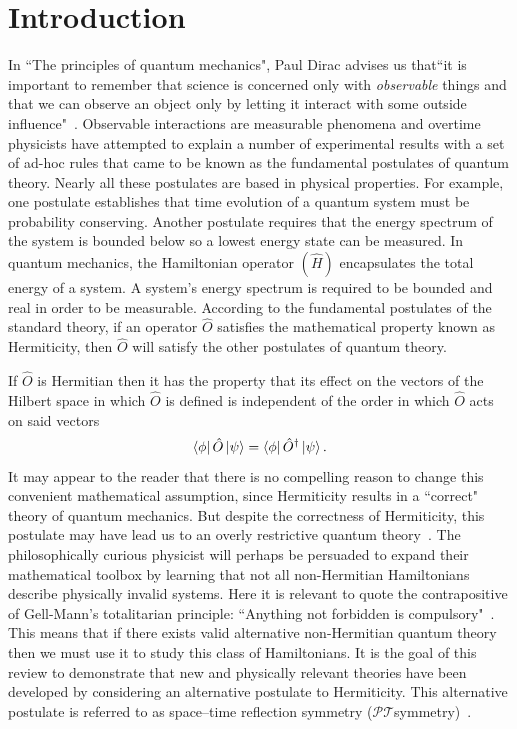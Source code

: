 \documentclass[12pt, a4paper]{report}
\newcommand\PT{\(\mathcal{PT}\)}
\begin{document}
\chapter{Introduction}\label{Introduction}
In ``The principles of quantum mechanics", Paul Dirac advises us that``it is important to remember that science is concerned only with \textit{observable} things and that we can observe an object only by letting it interact with some outside influence"~\cite{POQM}. Observable interactions are measurable phenomena and overtime physicists have attempted to explain a number of experimental results with a set of ad-hoc rules that came to be known as the fundamental postulates of quantum theory. Nearly all these postulates are based in physical properties. For example, one postulate establishes that time evolution of a quantum system must be probability conserving. Another postulate requires that the energy spectrum of the system is bounded below so a lowest energy state can be measured. In quantum mechanics, the Hamiltonian operator $(\hat{H})$ encapsulates the total energy of a system. A system's energy spectrum is required to be bounded and real in order to be measurable. According to the fundamental postulates of the standard theory, if an operator $\hat{O}$ satisfies the mathematical property known as Hermiticity, then $\hat{O}$ will satisfy the other postulates of quantum theory.

If $\hat{O}$ is Hermitian then it has the property that its effect on the vectors of the Hilbert space in which $\hat{O}$ is defined is independent of the order in which $\hat{O}$ acts on said vectors~\cite{Jones-Smith}
\begin{equation}\label{eq:1.1}
\bra{\phi}\hat{O}\ket{\psi} = \bra{\phi}\hat{O}^{\dagger}\ket{\psi}.
\end{equation}
It may appear to the reader that there is no compelling reason to change this convenient mathematical assumption, since Hermiticity results in a ``correct" theory of quantum mechanics. But despite the correctness of Hermiticity, this postulate may have lead us to an overly restrictive quantum theory~\cite{MustaHbeHermitian}. The philosophically curious physicist will perhaps be persuaded to expand their mathematical toolbox by learning that not all non-Hermitian Hamiltonians describe physically invalid systems. Here it is relevant to quote the contrapositive of Gell-Mann's totalitarian principle: ``Anything not forbidden is compulsory"~\cite{MGM}. This means that if there exists valid alternative non-Hermitian quantum theory then we must use it to study this class of Hamiltonians.
It is the goal of this review to demonstrate that new and physically relevant theories have been developed by considering an alternative postulate to Hermiticity. This alternative postulate is referred to as space–time reflection symmetry (\PT\:symmetry)~\cite{MustaHbeHermitian}. 
\end{document}
